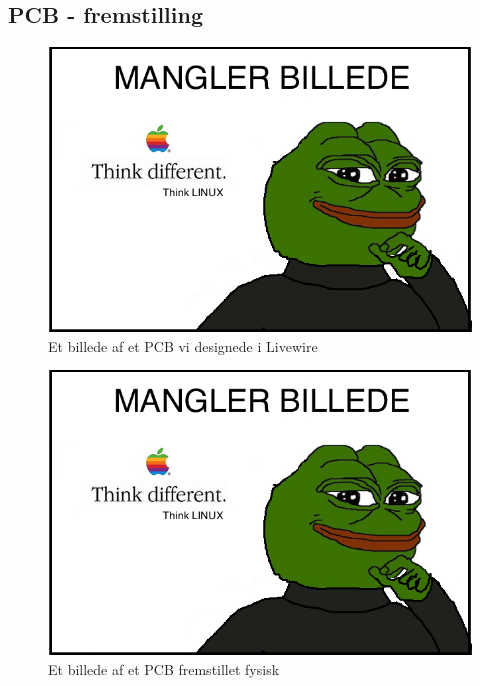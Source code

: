 \subsection{PCB - fremstilling}\label{subs:pcbfremstilling}
	\begin{figure}[H]
		\centering
	    \includegraphics[width=13cm]{figures/stock.jpg}
		\caption{Et billede af et PCB vi designede i Livewire}
		\label{fig:PCBPrint}
	\end{figure}
	\begin{figure}[H]
		\centering
	    \includegraphics[width=13cm]{figures/stock.jpg}
		\caption{Et billede af et PCB fremstillet fysisk}
		\label{fig:PCBfysisk}
	\end{figure}
